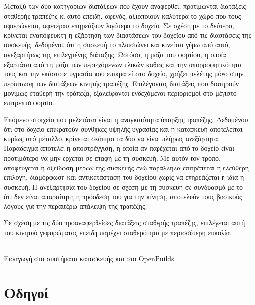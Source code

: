 Μεταξύ των δύο κατηγοριών διατάξεων που έχουν αναφερθεί, προτιμώνται διατάξεις
σταθερής τραπέζης κι αυτό επειδή, αφενός, αξιοποιούν καλύτερα το χώρο που τους
αφιερώνεται, αφετέρου επηρεάζουν λιγότερο το δοχείο.
Σε σχέση με το δεύτερο, κρίνεται αναπόφευκτη η εξάρτηση των διαστάσεων του
δοχείου από τις διαστάσεις της συσκευής, δεδομένου ότι η συσκευή το πλαισιώνει
και κινείται γύρω από αυτό, ανεξαρτήτως της επιλεγμένης διάταξης. Ωστόσο, η μάζα
του φορτίου, η οποία εξαρτάται από τη μάζα των περιεχόμενων υλικών καθώς και την
απορροφητικότητα τους και την εκάστοτε υγρασία που επικρατεί στο δοχείο, χρήζει
μελέτης μόνο στην περίπτωση των διατάξεων κινητής τραπέζης. Επιλέγοντας
διατάξεις που διατηρούν μονίμως σταθερή την τράπεζα, εξαλείφονται ενδεχόμενοι
περιορισμοί στο μέγιστο επιτρεπτό φορτίο.
%
%
%

Επόμενο στοιχείο που μελετάται είναι η αναγκαιότητα ύπαρξης τραπέζης. Δεδομένου
ότι στο δοχείο επικρατούν συνθήκες υψηλής υγρασίας και η κατασκευή αποτελείται
κυρίως από μέταλλο, κρίνεται σκόπιμο τα δύο να είναι πλήρως ανεξάρτητα.
Παράδειγμα αποτελεί η αποστράγγιση, η οποία αν παρέχεται από το δοχείο είναι
προτιμότερο να μην έρχεται σε επαφή με τη συσκευή.
Με αυτόν τον τρόπο, αποφεύγεται η οξείδωση μερών της συσκευής ενώ παράλληλα
επιτρέπεται η ελεύθερη επιλογή, διαμόρφωση και αντικατάσταση του δοχείου χωρίς
να επηρεάζεται η ίδια η συσκευή.
Η ανεξαρτησία του δοχείου σε σχέση με τη συσκευή σε συνδυασμό με το ότι δεν
είναι απαραίτητη η πρόσδεση του για την κίνηση, αποτελούν τους βασικούς λόγους
για την περαιτέρω απάλειψη της τραπέζης.

Σε σχέση με τις δύο προαναφερθείσες διατάξεις σταθερής τραπέζης, επιλέγεται αυτή
του κινητού γεφυρώματος επειδή παρέχει σταθερότητα με περισσότερη ευκολία.

~\\
Εισαγωγή στο συστήματα κατασκευής και στο OpenBuilds.
\\

\section{Οδηγοί}

